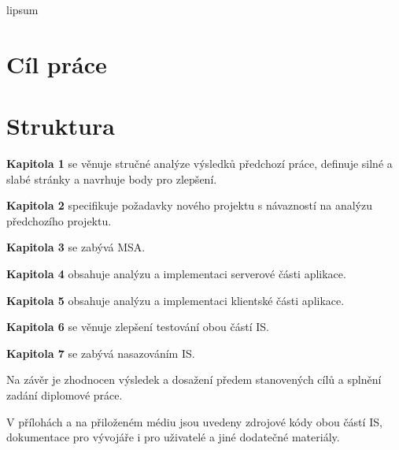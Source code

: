 lipsum


\clearpage



\section{Cíl práce}\label{sec:cil-prace}


\clearpage



\section{Struktura}\label{sec:struktura}

\textbf{Kapitola 1} se věnuje stručné analýze výsledků předchozí práce, definuje silné a slabé stránky a navrhuje body pro zlepšení.

\textbf{Kapitola 2} specifikuje požadavky nového projektu s návazností na analýzu předchozího projektu.

\textbf{Kapitola 3} se zabývá \gls{MSA}.

\textbf{Kapitola 4} obsahuje analýzu a implementaci serverové části aplikace.

\textbf{Kapitola 5} obsahuje analýzu a implementaci klientské části aplikace.

\textbf{Kapitola 6} se věnuje zlepšení testování obou částí \gls{IS}.

\textbf{Kapitola 7} se zabývá nasazováním \gls{IS}.

Na závěr je zhodnocen výsledek a dosažení předem stanovených cílů a splnění zadání diplomové práce.

V přílohách a na přiloženém médiu jsou uvedeny zdrojové kódy obou částí \gls{IS}, dokumentace pro vývojáře i pro uživatelé a jiné dodatečné materiály.

